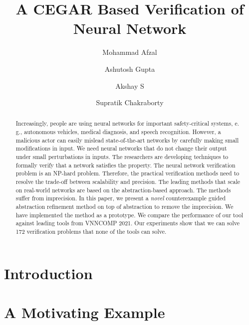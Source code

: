 \documentclass[10pt]{llncs}
\title{A CEGAR Based Verification of Neural Network}
\author{Mohammad Afzal\inst{1,2}\and Ashutosh Gupta\inst{1}\and Akshay S\inst{1}\and Supratik Chakraborty\inst{1}}
\institute{Indian Institute of Technology, Bombay, India\and TCS Research, Pune, India}
\begin{document}
\maketitle

\begin{abstract}
  Increasingly, people are using neural networks for important
  safety-critical systems, e. g., autonomous vehicles,
  medical diagnosis, and speech recognition.
  However, a malicious actor can easily
  mislead state-of-the-art networks
  by carefully making small modifications in input.
  We need neural networks that do not change their output
  under small perturbations in inputs.
  The researchers are developing techniques to formally
  verify that a network satisfies the property.
  The neural network verification problem is an NP-hard problem.
  Therefore, the practical verification methods need to resolve the
  trade-off between scalability and precision.
  The leading methods that scale on real-world
  networks are based on the abstraction-based approach.
  The methods suffer from imprecision.
  In this paper, %
  we present a {\em novel} counterexample guided abstraction
  refinement method on top of abstraction \deeppoly{} to remove
  the imprecision.  
  We have implemented the method as a prototype.
  We compare the performance of our tool against leading tools from VNNCOMP 2021.
  Our experiments show that we can solve 172
  verification problems that none of the tools
  can solve.
\end{abstract}

\section{Introduction}
\label{sec:intro}



\section{A Motivating Example}
\label{sec:motivation}

\end{document}

